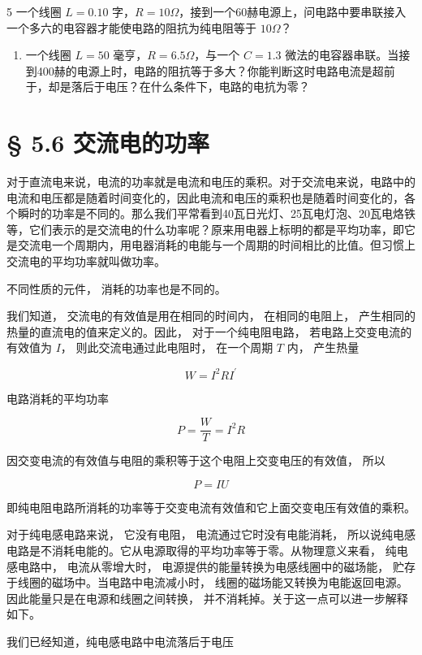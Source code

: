5 一个线圈 \(L = 0.10\)
字，\(R = 10\Omega\)，接到一个60赫电源上，问电路中要串联接入一个多六的电容器才能使电路的阻抗为纯电阻等于
\(10\Omega\)？

\begin{enumerate}
\def\labelenumi{\arabic{enumi}.}
\setcounter{enumi}{5}
\tightlist
\item
  一个线圈 \(L = 50\) 毫亨，\(R = 6.5\Omega\)，与一个 \(C = 1.3\)
  微法的电容器串联。当接到400赫的电源上时，电路的阻抗等于多大？你能判断这时电路电流是超前于，却是落后于电压？在什么条件下，电路的电抗为零？
\end{enumerate}

\section{§ 5.6 交流电的功率}\label{ux4ea4ux6d41ux7535ux7684ux529fux7387}

对于直流电来说，电流的功率就是电流和电压的乘积。对于交流电来说，电路中的电流和电压都是随着时间变化的，因此电流和电压的乘积也是随着时间变化的，各个瞬时的功率是不同的。那么我们平常看到40瓦日光灯、25瓦电灯泡、20瓦电烙铁等，它们表示的是交流电的什么功率呢？原来用电器上标明的都是平均功率，即它是交流电一个周期内，用电器消耗的电能与一个周期的时间相比的比值。但习惯上交流电的平均功率就叫做功率。

不同性质的元件， 消耗的功率也是不同的。

我们知道， 交流电的有效值是用在相同的时间内， 在相同的电阻上，
产生相同的热量的直流电的值来定义的。因此， 对于一个纯电阻电路，
若电路上交变电流的有效值为 \(I\)， 则此交流电通过此电阻时， 在一个周期
\(T\) 内， 产生热量

\[
W = I^{2} R I^{\prime}
\]

电路消耗的平均功率

\[
P = \frac{W}{T} = I^{2} R
\]

因交变电流的有效值与电阻的乘积等于这个电阻上交变电压的有效值， 所以

\[
P = I U
\]

即纯电阻电路所消耗的功率等于交变电流有效值和它上面交变电压有效值的乘积。

对于纯电感电路来说， 它没有电阻， 电流通过它时没有电能消耗，
所以说纯电感电路是不消耗电能的。它从电源取得的平均功率等于零。从物理意义来看，
纯电感电路中， 电流从零增大时， 电源提供的能量转换为电感线圈中的磁场能，
贮存于线圈的磁场中。当电路中电流减小时，
线圈的磁场能又转换为电能返回电源。因此能量只是在电源和线圈之间转换，
并不消耗掉。关于这一点可以进一步解释如下。

我们已经知道，纯电感电路中电流落后于电压

